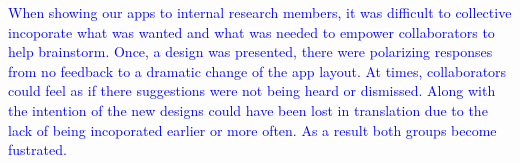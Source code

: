 \documentclass[letterpaper,inpress]{jdsart}
\begin{document}
{\textcolor{blue}{When showing our apps to internal research members, it was difficult to collective incoporate what was wanted and what was needed to empower collaborators to help brainstorm. Once, a design was presented, there were polarizing responses from no feedback to a dramatic change of the app layout. At times, collaborators could feel as if there suggestions were not being heard or dismissed. Along with the intention of the new designs could have been lost in translation due to the lack of being incoporated earlier or more often. As a result both groups become fustrated.  }}



\end{document}
